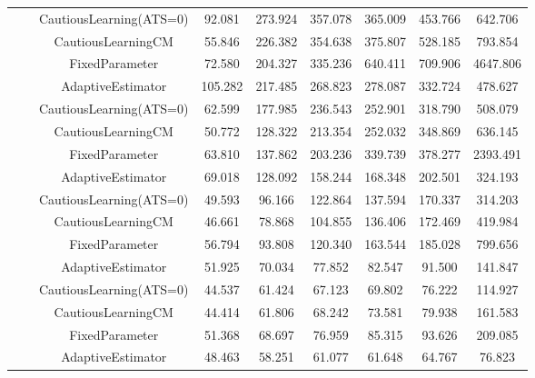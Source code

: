 \begin{table}[!h]
\begin{tabular}[t]{ccccccccc}
 &  & CautiousLearning(ATS=0) & 92.081 & 273.924 & 357.078 & 365.009 & 453.766 & 642.706\\

 &  & CautiousLearningCM & 55.846 & 226.382 & 354.638 & 375.807 & 528.185 & 793.854\\

 & \multirow[t]{-4}{*}{\centering\arraybackslash 0.25} & FixedParameter & 72.580 & 204.327 & 335.236 & 640.411 & 709.906 & 4647.806\\
\cmidrule{2-9}
 &  & AdaptiveEstimator & 105.282 & 217.485 & 268.823 & 278.087 & 332.724 & 478.627\\

 &  & CautiousLearning(ATS=0) & 62.599 & 177.985 & 236.543 & 252.901 & 318.790 & 508.079\\

 &  & CautiousLearningCM & 50.772 & 128.322 & 213.354 & 252.032 & 348.869 & 636.145\\

 & \multirow[t]{-4}{*}{\centering\arraybackslash 0.35} & FixedParameter & 63.810 & 137.862 & 203.236 & 339.739 & 378.277 & 2393.491\\
\cmidrule{2-9}
 &  & AdaptiveEstimator & 69.018 & 128.092 & 158.244 & 168.348 & 202.501 & 324.193\\

 &  & CautiousLearning(ATS=0) & 49.593 & 96.166 & 122.864 & 137.594 & 170.337 & 314.203\\

 &  & CautiousLearningCM & 46.661 & 78.868 & 104.855 & 136.406 & 172.469 & 419.984\\

 & \multirow[t]{-4}{*}{\centering\arraybackslash 0.50} & FixedParameter & 56.794 & 93.808 & 120.340 & 163.544 & 185.028 & 799.656\\
\cmidrule{2-9}
 &  & AdaptiveEstimator & 51.925 & 70.034 & 77.852 & 82.547 & 91.500 & 141.847\\

 &  & CautiousLearning(ATS=0) & 44.537 & 61.424 & 67.123 & 69.802 & 76.222 & 114.927\\

 &  & CautiousLearningCM & 44.414 & 61.806 & 68.242 & 73.581 & 79.938 & 161.583\\

 & \multirow[t]{-4}{*}{\centering\arraybackslash 0.75} & FixedParameter & 51.368 & 68.697 & 76.959 & 85.315 & 93.626 & 209.085\\
\cmidrule{2-9}
 &  & AdaptiveEstimator & 48.463 & 58.251 & 61.077 & 61.648 & 64.767 & 76.823\\


\end{tabular}
\end{table}
